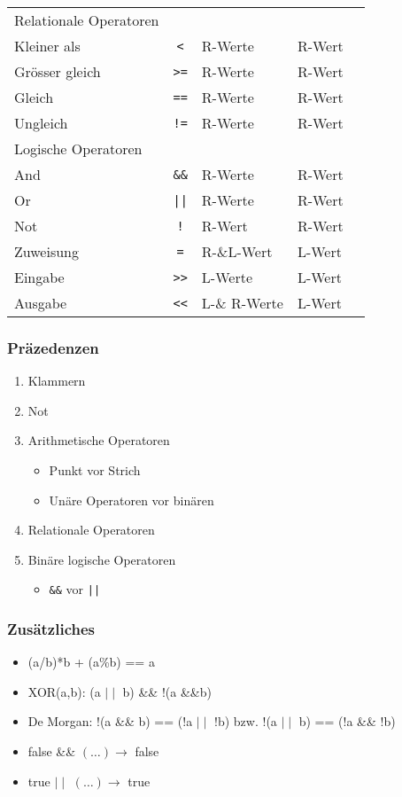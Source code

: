 \documentclass[a3paper, 10pt, landscape]{scrartcl}
\newcommand{\code}[1]{\texttt{#1}}
\begin{document}
\begin{multicols*}{3}
\begin{tabular}{l c l l l}
	\hline
	
	Relationale Operatoren \\
	Kleiner als & \code{<} & R-Werte & R-Wert\\
	Grösser gleich & \code{>=} & R-Werte & R-Wert\\
	Gleich  & \code{==} & R-Werte & R-Wert\\
	Ungleich & \code{!=} & R-Werte & R-Wert\\
	
	\hline
	
	Logische Operatoren \\
	And & \code{\&\&} & R-Werte & R-Wert \\
	Or & \code{||} & R-Werte & R-Wert \\
	Not & \code{!} & R-Wert & R-Wert \\
	
	\hline
	
	Zuweisung & \code{=} & R-\&L-Wert & L-Wert \\
	
	Eingabe & \code{>>}  & L-Werte & L-Wert\\
	Ausgabe & \code{<<} & L-\& R-Werte & L-Wert\\
	
	\end{tabular}
	
	\subsubsection{Präzedenzen}
	\begin{enumerate}
		\item Klammern
		\item Not
		\item Arithmetische Operatoren
		\begin{itemize}
			\item Punkt vor Strich
			\item Unäre Operatoren vor binären
		\end{itemize}
		\item Relationale Operatoren
		\item Binäre logische Operatoren
		\begin{itemize}
			\item \code{\&\&} vor \code{||}
		\end{itemize}
	\end{enumerate}
	
	\subsubsection{Zusätzliches}
	\begin{itemize}
		\item (a/b)*b + (a\%b) == a
		\item XOR(a,b): (a $\mid\mid$ b) \&\& !(a \&\&b)
		\item De Morgan: !(a \&\& b) == (!a $\mid\mid$ !b) bzw. !(a $\mid\mid$ b) == (!a \&\& !b)
		\item false \&\& $(\dots) \rightarrow$ false
		\item true $\mid\mid$ $(\dots) \rightarrow$ true


\end{itemize}
\end{multicols*}
\end{document}

